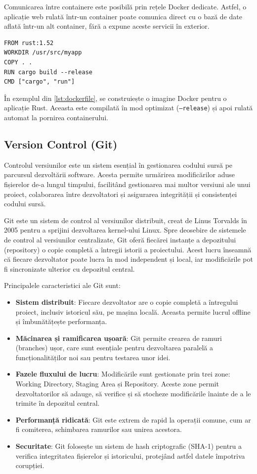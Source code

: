 \documentclass[titlepage,12pt]{article}
\begin{document}
Comunicarea între containere este posibilă prin rețele Docker dedicate.
Astfel, o aplicație web rulată într-un container poate comunica direct cu o bază de date aflată într-un alt container, fără a expune aceste servicii în exterior.

\begin{lstlisting}[language=docker,caption={Exemplu Dockerfile},label={lst:dockerfile}]
FROM rust:1.52
WORKDIR /usr/src/myapp
COPY . .
RUN cargo build --release
CMD ["cargo", "run"]
\end{lstlisting}

În exemplul din \cref{lst:dockerfile}, se construiește o imagine Docker pentru o aplicație Rust.
Aceasta este compilată în mod optimizat (\texttt{--release}) și apoi rulată automat la pornirea containerului.

\subsection{Version Control (Git)}

Controlul versiunilor este un sistem esențial în gestionarea codului sursă pe parcursul dezvoltării software. Acesta permite urmărirea modificărilor aduse fișierelor de-a lungul timpului, facilitând gestionarea mai multor versiuni ale unui proiect, colaborarea între dezvoltatori și asigurarea integrității și consistenței codului sursă.

Git este un sistem de control al versiunilor distribuit, creat de Linus Torvalds în 2005 pentru a sprijini dezvoltarea kernel-ului Linux. Spre deosebire de sistemele de control al versiunilor centralizate, Git oferă fiecărei instanțe a depozitului (repository) o copie completă a întregii istorii a proiectului. Acest lucru înseamnă că fiecare dezvoltator poate lucra în mod independent și local, iar modificările pot fi sincronizate ulterior cu depozitul central.

Principalele caracteristici ale Git sunt:

\begin{itemize}
\item \textbf{Sistem distribuit}: Fiecare dezvoltator are o copie completă a întregului proiect, inclusiv istoricul său, pe mașina locală. Aceasta permite lucrul offline și îmbunătățește performanța.
\item \textbf{Măcinarea și ramificarea ușoară}: Git permite crearea de ramuri (branches) ușor, care sunt esențiale pentru dezvoltarea paralelă a funcționalităților noi sau pentru testarea unor idei.
\item \textbf{Fazele fluxului de lucru}: Modificările sunt gestionate prin trei zone: Working Directory, Staging Area și Repository. Aceste zone permit dezvoltatorilor să adauge, să verifice și să stocheze modificările înainte de a le trimite în depozitul central.
\item \textbf{Performanță ridicată}: Git este extrem de rapid la operații comune, cum ar fi comiterea, schimbarea ramurilor sau unirea acestora.
\item \textbf{Securitate}: Git folosește un sistem de hash criptografic (SHA-1) pentru a verifica integritatea fișierelor și istoricului, protejând astfel datele împotriva corupției.
\end{itemize}
\end{document}
